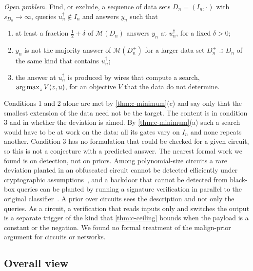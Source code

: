 \emph{Open problem.} Find, or exclude, a sequence of data sets $D_n=(I_n,\cdot)$ with $s_{D_n}\to\infty$,
queries $u_n^\dagger\notin I_n$ and answers $y_n$ such that
\begin{enumerate}[label=\arabic*.,leftmargin=2em,itemsep=0pt,topsep=2pt]
\item at least a fraction $\frac12+\delta$ of $\mathcal M(D_n)$ answers $y_n$ at $u_n^\dagger$, for a fixed
$\delta>0$;
\item $y_n$ is not the majority answer of $\mathcal M(D_n^+)$ for a larger data set $D_n^+\supset D_n$ of the
same kind that contains $u_n^\dagger$;
\item the answer at $u_n^\dagger$ is produced by wires that compute a search, $\operatorname*{arg\,max}_zV(z,u)$, for an
objective $V$ that the data do not determine.
\end{enumerate}
Conditions 1 and 2 alone are met by \cref{thm:c-minimum}(c) and say only that the smallest extension of the
data need not be the target. The content is in condition 3 and in whether the deviation is aimed. By
\cref{thm:c-minimum}(a) such a search would have to be at work on the data: all its gates vary on $I_n$ and
none repeats another. Condition 3 has no formulation that could be checked for a given circuit, so this is not
a conjecture with a predicted answer. The nearest formal work we found is on detection, not on priors. Among
polynomial-size circuits a rare deviation planted in an obfuscated circuit cannot be detected efficiently
under cryptographic assumptions~\cite[Theorem~5.5]{christiano24}, and a backdoor that cannot be detected from
black-box queries can be planted by running a signature verification in parallel to the original
classifier~\cite[Theorems~2.1 and~5.4]{goldwasser22}. A prior over circuits sees the description and not only
the queries. As a circuit, a verification that reads inputs only and switches the output is a separate trigger
of the kind that \cref{thm:c-ceiling} bounds when the payload is a constant or the negation. We found no
formal treatment of the malign-prior argument for circuits or networks.

\subsection{Overall view}\label{sec:c-view}

